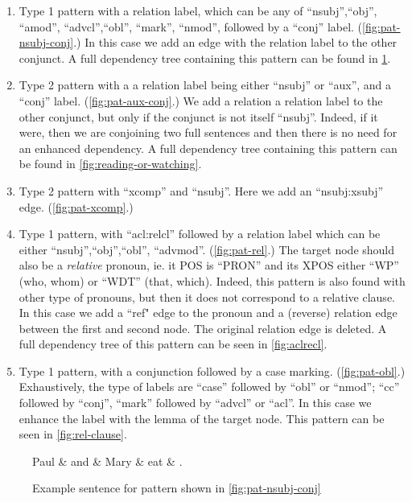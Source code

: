 \documentclass[11pt,a4paper]{article}
\begin{document}
\begin{enumerate}
\item Type 1 pattern with a relation label, which can be any of
  ``nsubj'',``obj'', ``amod'', ``advcl'',``obl'', ``mark'', ``nmod'', followed by a
  ``conj'' label. (\cref{fig:pat-nsubj-conj}.) In this case we add an
  edge with the relation label to the other conjunct.
  A full dependency tree containing this pattern can be found in \cref{fig:paul-and-mary}.
  \label{item:paul-and-mary}
\item Type 2 pattern with a a relation label being either ``nsubj'' or
  ``aux'', and a ``conj'' label. (\cref{fig:pat-aux-conj}.) We add a relation a relation label to
  the other conjunct, but only if the conjunct is not itself
  ``nsubj''. Indeed, if it were, then we are conjoining two full
  sentences and then there is no need for an enhanced dependency.
  A full dependency tree containing this pattern can be found in \cref{fig:reading-or-watching}.
  \label{item:reading-or-watching}
\item Type 2 pattern with ``xcomp'' and ``nsubj''. Here we add an
  ``nsubj:xsubj'' edge. (\cref{fig:pat-xcomp}.)
\item Type 1 pattern, with ``acl:relcl'' followed by a relation label
  which can be either ``nsubj'',``obj'',``obl'',
  ``advmod''. (\cref{fig:pat-rel}.) The target node should also be a
  \emph{relative} pronoun, ie. it POS is ``PRON'' and its XPOS either
  ``WP'' (who, whom) or ``WDT'' (that, which). Indeed, this pattern is
  also found with other type of pronouns, but then it does not
  correspond to a relative clause.  In this case we add a ``ref" edge to
  the pronoun and a (reverse) relation edge between the first and
  second node. The original relation edge is deleted. A full dependency
  tree of this pattern can be seen in \cref{fig:aclrecl}.
  \item Type 1 pattern, with a conjunction followed by a case
   marking. (\cref{fig:pat-obl}.) Exhaustively, the type of labels
   are ``case'' followed by ``obl'' or ``nmod''; ``cc'' followed by
   ``conj'', ``mark'' followed by ``advcl'' or ``acl''. In this case we
   enhance the label with the lemma of the target node. This pattern
   can be seen in \cref{fig:rel-clause}.
\end{enumerate}

\begin{figure}
    \centering
    \begin{dependency}
    \begin{deptext}[column sep=1em]
    Paul \& and \& Mary \& eat \& . \\
    \end{deptext}
    \end{dependency}
    \caption{Example sentence for pattern shown in \cref{fig:pat-nsubj-conj}}
    \label{fig:paul-and-mary}
\end{figure}
\end{document}
